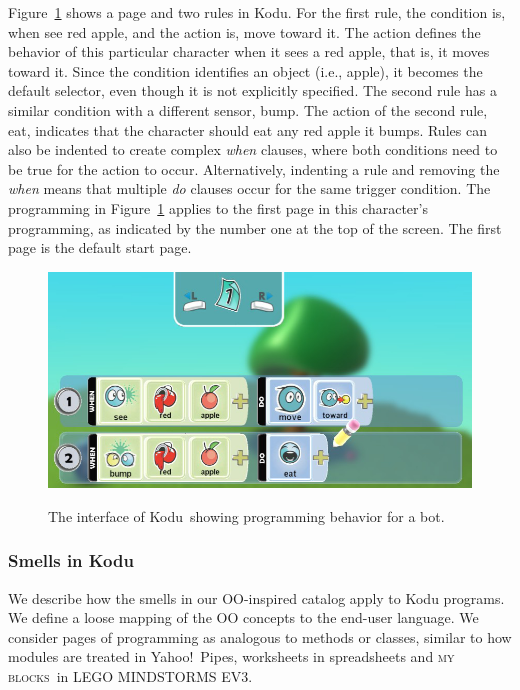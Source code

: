 \documentclass{sig-alternate}
\newcommand{\ms}{LEGO MINDSTORMS EV3}
\newcommand{\mbs}{\textsc{my blocks}}
\begin{document}
Figure~\ref{fig:Kodu} shows a page and two rules  in Kodu. For the first rule, the condition is, when see red apple, and the action is, move toward it. The action defines the behavior of this particular character when it sees a red apple, that is, it moves toward it. Since the condition identifies an object (i.e., apple), it becomes the default selector, even though it is not explicitly specified. The second rule has a similar condition with a different sensor, bump. The action of the second rule, eat, indicates that the character should eat any red apple it bumps. 
Rules can also be indented to create complex \emph{when} clauses, where both conditions need to be true for the action to occur. Alternatively, indenting a rule and removing the \emph{when} means that multiple \emph{do} clauses occur for the same trigger condition. 
The programming in Figure~\ref{fig:Kodu} applies to the first page in this character's programming, as indicated by the number one at the top of the screen. The first page is the default start page.


\begin{figure}[ht]
\caption{The interface of Kodu~showing programming behavior for a bot.}
\centering
\includegraphics[width=\columnwidth]{programmingui.png}
\label{fig:Kodu}
\end{figure}



\subsubsection{Smells in Kodu}
We describe how the smells in our OO-inspired catalog apply to Kodu programs. We define a loose mapping of the OO concepts to the end-user language. We consider pages of programming as analogous to methods or classes, similar to how modules are treated in Yahoo!\ Pipes, worksheets in spreadsheets and \mbs~in \ms. 
\end{document}
